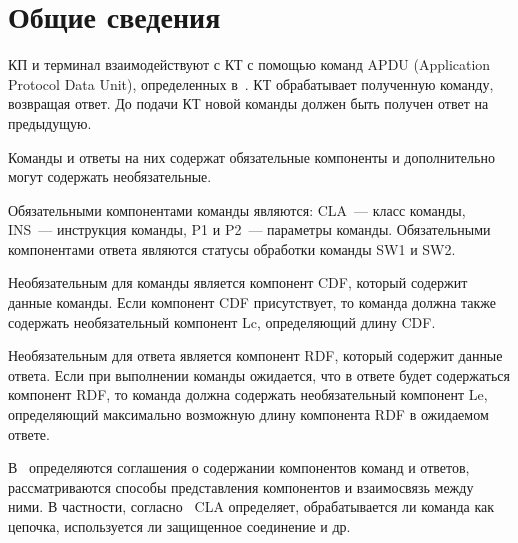 \section{Общие сведения}\label{CMDS.Intro}

КП и терминал взаимодействуют с КТ с помощью команд APDU (Application
Protocol Data Unit), определенных в~\cite{APDU}. КТ обрабатывает полученную
команду, возвращая ответ. До подачи КТ новой команды должен быть получен
ответ на предыдущую.

Команды и ответы на них содержат обязательные компоненты и дополнительно 
могут содержать необязательные.  

Обязательными компонентами команды являются: CLA~--- класс команды, INS~---
инструкция команды, P1 и P2~--- параметры команды. Обязательными компонентами
ответа являются статусы обработки команды SW1 и SW2.

Необязательным для команды является компонент CDF, который содержит данные 
команды. Если компонент CDF присутствует, то команда должна также содержать 
необязательный компонент Lc, определяющий длину CDF. 

Необязательным для ответа является компонент RDF, который содержит данные 
ответа. Если при выполнении команды ожидается, что в ответе будет 
содержаться компонент RDF, то команда должна содержать необязательный 
компонент Le, определяющий максимально возможную длину компонента RDF в 
ожидаемом ответе.

В~\cite{APDU} определяются соглашения о содержании компонентов команд и
ответов, рассматриваются способы представления компонентов и взаимосвязь
между ними. В частности, согласно~\cite{APDU} CLA определяет,
обрабатывается ли команда как цепочка, используется ли защищенное
соединение и др.

